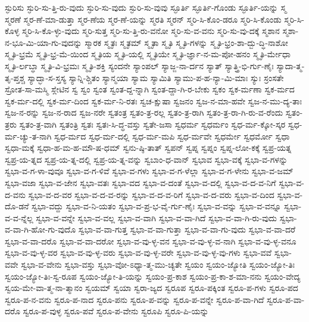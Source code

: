 {ಸ್ಫುರಿಸು
ಸ್ಫುರಿ-ಸು-ತ್ತಿ-ರು-ವುದು
ಸ್ಫುರಿ-ಸು-ವುದು
ಸ್ಫುರಿ-ಸು-ವುವು
ಸ್ಫೂರ್ತಿ
ಸ್ಫೂರ್ತಿ-ಗೊಂಡು
ಸ್ಫೂರ್ತಿ-ಯನ್ನು
ಸ್ಮ
ಸ್ಮರಣೆ
ಸ್ಮರ-ಣೆ-ಮಾ-ಡುತ್ತಾ
ಸ್ಮರ-ಣೆಯ
ಸ್ಮರ-ಣೆ-ಯನ್ನು
ಸ್ಮರತಿ
ಸ್ಮರನ್
ಸ್ಮರಿ-ಸಿ-ಕೊಂ-ಡರೂ
ಸ್ಮರಿ-ಸಿ-ಕೊಂಡು
ಸ್ಮರಿ-ಸಿ-ಕೊಳ್ಳ
ಸ್ಮರಿ-ಸಿ-ಕೊ-ಳ್ಳು-ವುದು
ಸ್ಮರಿ-ಸುತ್ತ
ಸ್ಮರಿ-ಸು-ತ್ತಿ-ರು-ವನೋ
ಸ್ಮರಿ-ಸು-ವ-ವನು
ಸ್ಮರಿ-ಸು-ವು-ದಕ್ಕೆ
ಸ್ಮಶಾನ
ಸ್ಮಶಾ-ನ-ಭೂ-ಮಿ-ಯಾ-ಗು-ವುದನ್ನು
ಸ್ಮಾರಕ
ಸ್ಮೃತಃ
ಸ್ಮೃತಮ್
ಸ್ಮೃತಾ
ಸ್ಮೃತಿ
ಸ್ಮೃತಿ-ಗಳನ್ನು
ಸ್ಮೃತಿ-ಭ್ರಂ-ಶಾ-ದ್ಬು-ದ್ಧಿ-ನಾಶೋ
ಸ್ಮೃತಿ-ಭ್ರಮೆ
ಸ್ಮೃತಿ-ಭ್ರ-ಮೆ-ಯಿಂದ
ಸ್ಮೃತಿಯ
ಸ್ಮೃತಿ-ಯಲ್ಲಿ
ಸ್ಮೃತಿಯೇ
ಸ್ಮೃತಿ-ರ್ಜ್ಞಾ-ನ-ಮ-ಪೋ-ಹನಂ
ಸ್ಮೃತಿ-ರ್ಮೇಧಾ
ಸ್ಮೃತಿ-ರ್ಲಬ್ಧಾ
ಸ್ಮೃತಿ-ವಿ-ಭ್ರಮಃ
ಸ್ಮೃತಿ-ಶಕ್ತಿ
ಸ್ಯಂದನೇ
ಸ್ಯಾಂಪಲ್
ಸ್ಯಾಜ್ಜ-ನಾ-ರ್ದನ
ಸ್ಯಾತ್
ಸ್ಯಾತ್ತ್ರಿ-ಭಿ-ರ್ಗು-ಣೈಃ
ಸ್ಯಾದಾ-ತ್ಮ-ತೃ-ಪ್ತಶ್ಚ
ಸ್ಯಾದ್ಭಾ-ಸ-ಸ್ತಸ್ಯ
ಸ್ಯಾನ್ನಿ-ಶ್ಚಿತಂ
ಸ್ಯಾನ್ಮಯಾ
ಸ್ಯಾಮ
ಸ್ಯಾಮಿತಿ
ಸ್ಯಾಮು-ಪ-ಹ-ನ್ಯಾ-ಮಿ-ಮಾಃ
ಸ್ಯುಃ
ಸ್ರಂಸತೇ
ಸ್ರೋತ-ಸಾ-ಮಸ್ಮಿ
ಸ್ಲೇಟಿನ
ಸ್ವ
ಸ್ವಂ
ಸ್ವಂತ
ಸ್ವಂತ-ದ್ದ-ನ್ನಾಗಿ
ಸ್ವಂತ-ದ್ದಾ-ಗಿ-ರ-ಬೇಕು
ಸ್ವಕಂ
ಸ್ವಕ-ರ್ಮಣಾ
ಸ್ವಕ-ರ್ಮದ
ಸ್ವಕ-ರ್ಮ-ದಲ್ಲಿ
ಸ್ವಕ-ರ್ಮ-ದಿಂದ
ಸ್ವಕ-ರ್ಮ-ನಿ-ರತಃ
ಸ್ವಚ-ಕ್ಷುಷಾ
ಸ್ವಜನಂ
ಸ್ವಜ-ನ-ಮಾ-ಹವೇ
ಸ್ವಜ-ನ-ಮು-ದ್ಯ-ತಾಃ
ಸ್ವಜ-ನ-ರನ್ನು
ಸ್ವಜ-ನ-ರಾದ
ಸ್ವಜ-ನರೇ
ಸ್ವತಂತ್ರ
ಸ್ವತಂ-ತ್ರ-ರಲ್ಲ
ಸ್ವತಂ-ತ್ರ-ರಾಗಿ
ಸ್ವತಂ-ತ್ರ-ರಾ-ಗಿ-ರು-ವ-ರೆಂದು
ಸ್ವತಂ-ತ್ರರು
ಸ್ವತಂ-ತ್ರ-ವಾಗಿ
ಸ್ವತಂತ್ರಿ
ಸ್ವತಃ
ಸ್ವತಃ-ಸಿ-ದ್ಧ-ವಸ್ತು
ಸ್ವತೇ-ಜಸಾ
ಸ್ವಧರ್ಮ
ಸ್ವಧರ್ಮಂ
ಸ್ವಧ-ರ್ಮ-ಕ್ಕೋ-ಸ್ಕರ
ಸ್ವಧ-ರ್ಮ-ಚ್ಯು-ತ-ನಾಗಿ
ಸ್ವಧ-ರ್ಮದ
ಸ್ವಧ-ರ್ಮ-ದಲ್ಲಿ
ಸ್ವಧ-ರ್ಮ-ಮಪಿ
ಸ್ವಧ-ರ್ಮವೇ
ಸ್ವಧರ್ಮೇ
ಸ್ವಧರ್ಮೋ
ಸ್ವಧಾ
ಸ್ವಧಾ-ಮಕ್ಕೆ
ಸ್ವಧಾ-ಹ-ಮ-ಹ-ಮೌ-ಷ-ಧಮ್
ಸ್ವನು-ಷ್ಠಿ-ತಾತ್
ಸ್ವಪನ್
ಸ್ವಪ್ನ
ಸ್ವಪ್ನಂ
ಸ್ವಪ್ನ-ಲೋ-ಕಕ್ಕೆ
ಸ್ವಪ್ರ-ಯತ್ನ
ಸ್ವಪ್ರ-ಯ-ತ್ನದ
ಸ್ವಪ್ರ-ಯ-ತ್ನ-ದಲ್ಲಿ
ಸ್ವಪ್ರ-ಯ-ತ್ನ-ವನ್ನು
ಸ್ವಬಾಂ-ಧ-ವಾನ್
ಸ್ವಭಾವ
ಸ್ವಭಾ-ವಕ್ಕೆ
ಸ್ವಭಾ-ವ-ಗಳನ್ನು
ಸ್ವಭಾ-ವ-ಗ-ಳಾ-ವುವೂ
ಸ್ವಭಾ-ವ-ಗ-ಳಿವೆ
ಸ್ವಭಾ-ವ-ಗಳು
ಸ್ವಭಾ-ವ-ಗ-ಳೆಲ್ಲಾ
ಸ್ವಭಾ-ವ-ಗ-ಳೇನು
ಸ್ವಭಾ-ವ-ಜಮ್
ಸ್ವಭಾ-ವಜಾ
ಸ್ವಭಾ-ವ-ಜೇನ
ಸ್ವಭಾ-ವತಃ
ಸ್ವಭಾ-ವದ
ಸ್ವಭಾ-ವ-ದಂತೆ
ಸ್ವಭಾ-ವ-ದಲ್ಲಿ
ಸ್ವಭಾ-ವ-ದ-ವ-ನಿಗೆ
ಸ್ವಭಾ-ವ-ದ-ವನು
ಸ್ವಭಾ-ವ-ದ-ವರ
ಸ್ವಭಾ-ವ-ದ-ವ-ರನ್ನು
ಸ್ವಭಾ-ವ-ದ-ವ-ರಿಗೆ
ಸ್ವಭಾ-ವ-ದ-ವರು
ಸ್ವಭಾ-ವ-ದಿಂದ
ಸ್ವಭಾ-ವ-ದೊ-ಡನೆ
ಸ್ವಭಾ-ವದ್ದು
ಸ್ವಭಾ-ವ-ನಿ-ಯತಂ
ಸ್ವಭಾ-ವ-ಪ್ರ-ಭ-ವೈ-ರ್ಗು-ಣೈಃ
ಸ್ವಭಾ-ವ-ವನ್ನು
ಸ್ವಭಾ-ವ-ವನ್ನೂ
ಸ್ವಭಾ-ವ-ವ-ನ್ನೆಲ್ಲ
ಸ್ವಭಾ-ವ-ವನ್ನೇ
ಸ್ವಭಾ-ವ-ವಲ್ಲ
ಸ್ವಭಾ-ವ-ವಾಗಿ
ಸ್ವಭಾ-ವ-ವಾ-ಗಿದೆ
ಸ್ವಭಾ-ವ-ವಾ-ಗಿ-ರು-ವುದು
ಸ್ವಭಾ-ವ-ವಾ-ಗಿ-ಹೋ-ಗು-ವುದೊ
ಸ್ವಭಾ-ವ-ವಾ-ಗುತ್ತ
ಸ್ವಭಾ-ವ-ವಾ-ಗುತ್ತಾ
ಸ್ವಭಾ-ವ-ವಾ-ಗು-ವುದು
ಸ್ವಭಾ-ವ-ವಾ-ದರೆ
ಸ್ವಭಾ-ವ-ವಾ-ದರೊ
ಸ್ವಭಾ-ವ-ವಾ-ದರೋ
ಸ್ವಭಾ-ವ-ವು-ಳ್ಳ-ವನ
ಸ್ವಭಾ-ವ-ವು-ಳ್ಳ-ವ-ನಾಗಿ
ಸ್ವಭಾ-ವ-ವು-ಳ್ಳ-ವನೂ
ಸ್ವಭಾ-ವ-ವು-ಳ್ಳ-ವರ
ಸ್ವಭಾ-ವ-ವು-ಳ್ಳ-ವರು
ಸ್ವಭಾ-ವ-ವು-ಳ್ಳ-ವರೇ
ಸ್ವಭಾ-ವ-ವು-ಳ್ಳ-ವು-ಗಳು
ಸ್ವಭಾ-ವವೆ
ಸ್ವಭಾ-ವವೇ
ಸ್ವಭಾ-ವ-ವೇನು
ಸ್ವಭಾ-ವಸ್ತು
ಸ್ವಭಾ-ವೋ-ಽಧ್ಯಾ-ತ್ಮ-ಮು-ಚ್ಯತೇ
ಸ್ವಯಂ
ಸ್ವಯಂ-ಜ್ಯೋತಿ
ಸ್ವಯಂ-ಜ್ಯೋ-ತಿಃ
ಸ್ವಯಂ-ಜ್ಯೋ-ತಿಃ-ಸ್ವ-ರೂಪ
ಸ್ವಯಂ-ಜ್ಯೋ-ತಿ-ಯನ್ನು
ಸ್ವಯಂ-ಪ್ರ-ಕಾಶ
ಸ್ವಯಂ-ಪ್ರ-ಕಾ-ಶ-ಮಾ-ನನು
ಸ್ವಯಂ-ವೇದ್ಯ
ಸ್ವಯ-ಮೇ-ವಾ-ತ್ಮ-ನಾ-ತ್ಮಾನಂ
ಸ್ವಯಮ್
ಸ್ವಯಾ
ಸ್ವರಾ-ಜ್ಯದ
ಸ್ವರೂಪ
ಸ್ವರೂ-ಪಕ್ಕಿಂತ
ಸ್ವರೂ-ಪ-ಗಳು
ಸ್ವರೂ-ಪದ
ಸ್ವರೂ-ಪ-ನ-ವನು
ಸ್ವರೂ-ಪ-ನಾದ
ಸ್ವರೂ-ಪನು
ಸ್ವರೂ-ಪ-ವನ್ನು
ಸ್ವರೂ-ಪ-ವನ್ನೇ
ಸ್ವರೂ-ಪ-ವಾ-ಗಿದೆ
ಸ್ವರೂ-ಪ-ವಾ-ದರೊ
ಸ್ವರೂ-ಪ-ವುಳ್ಳ
ಸ್ವರೂ-ಪವೆ
ಸ್ವರೂ-ಪ-ವೇನು
ಸ್ವರೂಪಿ
ಸ್ವರೂ-ಪಿ-ಯನ್ನು
}
